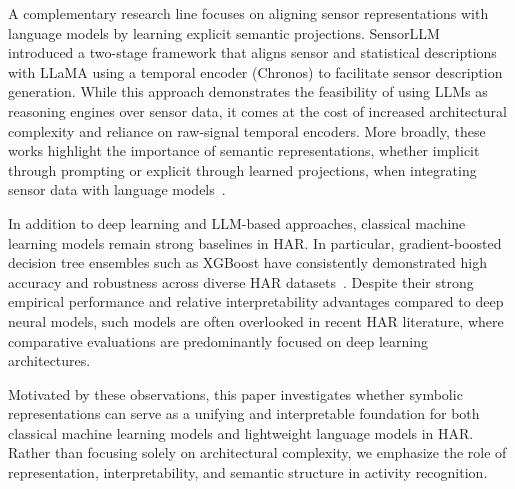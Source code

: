 \documentclass[preprint,12pt]{elsarticle}
\begin{document}
A complementary research line focuses on aligning sensor representations with language models by learning explicit semantic projections. SensorLLM~\cite{li2025sensorllm} introduced a two-stage framework that aligns sensor and statistical descriptions with LLaMA using a temporal encoder (Chronos) to facilitate sensor description generation. While this approach demonstrates the feasibility of using LLMs as reasoning engines over sensor data, it comes at the cost of increased architectural complexity and reliance on raw-signal temporal encoders. More broadly, these works highlight the importance of semantic representations, whether implicit through prompting or explicit through learned projections, when integrating sensor data with language models~\cite{zhang2025sensorlm}.

In addition to deep learning and LLM-based approaches, classical machine learning models remain strong baselines in HAR. In particular, gradient-boosted decision tree ensembles such as XGBoost have consistently demonstrated high accuracy and robustness across diverse HAR datasets~\cite{zhang2019comprehensive, o2019comparison}. Despite their strong empirical performance and relative interpretability advantages compared to deep neural models, such models are often overlooked in recent HAR literature, where comparative evaluations are predominantly focused on deep learning architectures.

Motivated by these observations, this paper investigates whether symbolic representations can serve as a unifying and interpretable foundation for both classical machine learning models and lightweight language models in HAR. Rather than focusing solely on architectural complexity, we emphasize the role of representation, interpretability, and semantic structure in activity recognition.
\end{document}
